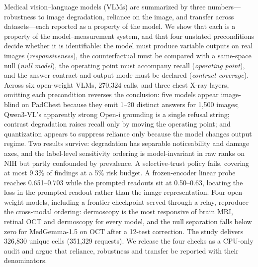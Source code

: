 
Medical vision--language models (VLMs) are summarized by three numbers---robustness
to image degradation, reliance on the image, and transfer across datasets---each
reported as a property of the model. We show that each is a property of the
model--measurement system, and that four unstated preconditions decide whether it is
identifiable: the model must produce variable outputs on real images
(\emph{responsiveness}), the counterfactual must be compared with a same-space null
(\emph{null model}), the operating point must accompany recall (\emph{operating
point}), and the answer contract and output mode must be declared (\emph{contract
coverage}). Across six open-weight VLMs, 270,324 calls, and three chest X-ray layers,
omitting each precondition reverses the conclusion: five models appear image-blind on
PadChest because they emit 1--20 distinct answers for 1,500 images; Qwen3-VL's
apparently strong Open-i grounding is a single refusal string; contrast degradation
raises recall only by moving the operating point; and quantization appears to suppress
reliance only because the model changes output regime. Two results survive: degradation
has separable noticeability and damage axes, and the label-level sensitivity ordering
is model-invariant in raw ranks on NIH but partly confounded by prevalence. A
selective-trust policy fails, covering at most 9.3\% of findings at a 5\% risk budget.
A frozen-encoder linear probe reaches 0.651--0.703 while the prompted readouts sit at
0.50--0.63, locating the loss in the prompted readout rather than the image
representation. Four open-weight models, including a frontier checkpoint served through a relay,
reproduce the cross-modal ordering: dermoscopy is the most responsive of brain MRI,
retinal OCT and dermoscopy for every model, and the null separation falls below zero
for MedGemma-1.5 on OCT after a 12-test correction. The study delivers 326,830 unique
cells (351,329 requests). We release the four checks as a CPU-only audit and argue
that reliance, robustness and transfer be reported with their denominators.
